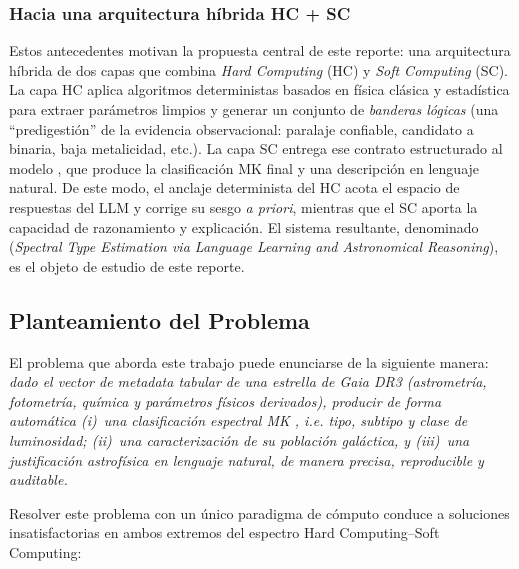 \subsubsection{Hacia una arquitectura híbrida HC + SC}

Estos antecedentes motivan la propuesta central de este reporte: una
arquitectura híbrida de dos capas que combina \emph{Hard Computing} (HC) y
\emph{Soft Computing} (SC). La capa HC aplica algoritmos deterministas basados
en física clásica y estadística para extraer parámetros limpios y generar un
conjunto de \emph{banderas lógicas} (una ``predigestión'' de la evidencia
observacional: paralaje confiable, candidato a binaria, baja metalicidad,
etc.). La capa SC entrega ese contrato estructurado al modelo \AstroSage{}, que
produce la clasificación MK final y una descripción en lenguaje natural. De
este modo, el anclaje determinista del HC acota el espacio de respuestas del LLM
y corrige su sesgo \emph{a priori}, mientras que el SC aporta la capacidad de
razonamiento y explicación. El sistema resultante, denominado \STELLAR{}
(\emph{Spectral Type Estimation via Language Learning and Astronomical
Reasoning}), es el objeto de estudio de este reporte.



\subsection{Planteamiento del Problema}
\label{sec:problema}

El problema que aborda este trabajo puede enunciarse de la siguiente manera:
\emph{dado el vector de metadata tabular de una estrella de Gaia DR3
(astrometría, fotometría, química y parámetros físicos derivados),
producir de forma automática (i)~una clasificación espectral MK , i.e. tipo,
subtipo y clase de luminosidad; (ii)~una caracterización de su población
galáctica, y (iii)~una justificación astrofísica en lenguaje natural, de manera
precisa, reproducible y auditable.}

Resolver este problema con un único paradigma de cómputo conduce a soluciones
insatisfactorias en ambos extremos del espectro Hard Computing--Soft Computing:

